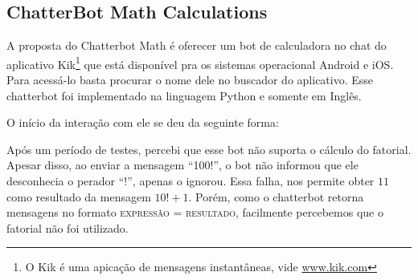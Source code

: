 \subsection{ChatterBot Math Calculations}\label{subsec:bot4} 


A proposta do Chatterbot Math é oferecer um bot de calculadora no chat do aplicativo Kik\footnote{O Kik é uma apicação de mensagens instantâneas, vide \url{www.kik.com}} que está disponível pra os sistemas operacional Android e iOS. Para acessá-lo basta procurar o nome dele no buscador do aplicativo. Esse chatterbot foi implementado na linguagem Python e somente em Inglês.

O início da interação com ele se deu da seguinte forma:



Após um período de testes, percebi que esse bot não suporta o cálculo do fatorial. Apesar disso, ao enviar a mensagem ``100!'', o bot não informou que ele desconhecia o perador ``!'', apenas o ignorou.
Essa falha, nos permite obter $11$ como resultado da mensagem $10! + 1$. Porém, como o chatterbot retorna mensagens no formato \textsc{expressão = resultado}, facilmente percebemos que o fatorial não foi utilizado.